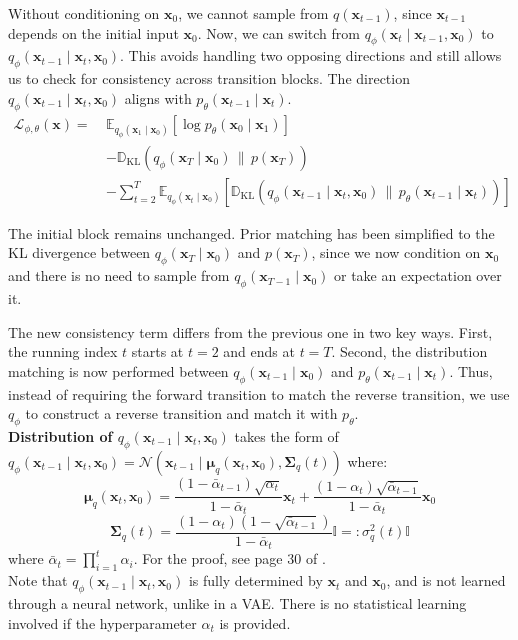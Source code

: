 \documentclass{article}
\newcommand{\x}{\mathbf{x}}
\newcommand{\N}{\mathcal{N}}
\newcommand{\E}{\mathbb{E}}
\newcommand{\D}{\mathbb{D}}
\newcommand{\dklbar}{\,\|\,}
\begin{document}
	Without conditioning on $\x_0$, we cannot sample from $q(\x_{t-1})$, since $\x_{t-1}$ depends on the initial input $\x_0$. Now, we can switch from $q_\phi(\x_t \mid \x_{t-1}, \x_0)$ to $q_\phi(\x_{t-1} \mid \x_t, \x_0)$. This avoids handling two opposing directions and still allows us to check for consistency across transition blocks. The direction $q_\phi(\x_{t-1} \mid \x_t, \x_0)$ aligns with $p_\theta(\x_{t-1} \mid \x_t)$.
	$$\begin{aligned}
		\mathcal{L}_{\phi, \theta} (\x) =\ & 
		\E_{q_\phi(\x_1 \mid \x_0)} 
		\left[ \log p_\theta(\x_0 \mid \x_1) \right] \\
		& - \D_{\mathrm{KL}} \left( q_\phi(\x_T \mid \x_{0}) \dklbar p(\x_T) \right) \\
		& - \sum_{t=2}^{T} \E_{q_\phi(\x_{t} \mid \x_0)} 
		\left[ \D_{\mathrm{KL}} \left( q_\phi(\x_{t-1} \mid \x_t, \x_0) \dklbar p_\theta(\x_{t-1} \mid \x_t) \right) \right]
	\end{aligned}$$
	
	The initial block remains unchanged. Prior matching has been simplified to the KL divergence between $q_\phi(\x_T \mid \x_0)$ and $p(\x_T)$, since we now condition on $\x_0$ and there is no need to sample from $q_\phi(\x_{T-1} \mid \x_0)$ or take an expectation over it.
	
	The new consistency term differs from the previous one in two key ways. First, the running index $t$ starts at $t = 2$ and ends at $t = T$. Second, the distribution matching is now performed between $q_\phi(\x_{t-1} \mid \x_0)$ and $p_\theta(\x_{t-1} \mid \x_t)$. Thus, instead of requiring the forward transition to match the reverse transition, we use $q_\phi$ to construct a reverse transition and match it with $p_\theta$. \\
	
	\textbf{Distribution of $q_\phi (\x_{t-1} \mid \x_t, \x_0)$} takes the form of $q_\phi (\x_{t-1} \mid \x_t, \x_0) = \N(\x_{t-1} \mid \boldsymbol{\mu}_q (\x_t, \x_0), \boldsymbol{\Sigma}_q (t))$ where: $$\boldsymbol{\mu}_q (\x_t, \x_0) = \frac{(1 - \bar{\alpha}_{t-1}) \sqrt{\alpha_t}}{1 - \bar{\alpha}_t} \x_t + \frac{(1 - \alpha_t) \sqrt{\bar{\alpha}_{t-1}}}{1 - \bar{\alpha}_t} \x_0$$
	$$\boldsymbol{\Sigma}_q (t) = \frac{(1 - \alpha_t) (1 - \sqrt{\bar{\alpha}_{t-1}})}{1 - \bar{\alpha}_t} \mathbb{I} =: \sigma_q^2 (t) \mathbb{I}$$
	where $\bar{\alpha}_t = \prod_{i=1}^t \alpha_i$. For the proof, see page 30 of \cite{chan2025}. \\
	
	Note that $q_\phi(\x_{t-1} \mid \x_t, \x_0)$ is fully determined by $\x_t$ and $\x_0$, and is not learned through a neural network, unlike in a VAE. There is no statistical learning involved if the hyperparameter $\alpha_t$ is provided.
	
\end{document}
